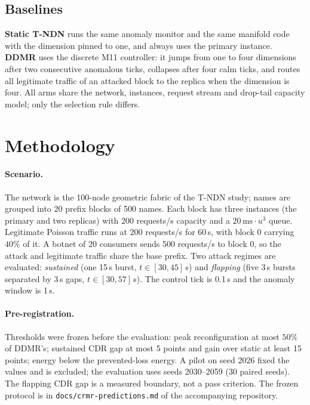 \documentclass[10pt,a4paper]{article}
\begin{document}
\subsection{Baselines}
\textbf{Static T-NDN} runs the same anomaly monitor and the same manifold code with
the dimension pinned to one, and always uses the primary instance.
\textbf{DDMR} uses the discrete M11 controller: it jumps from one to four
dimensions after two consecutive anomalous ticks, collapses after four calm ticks,
and routes all legitimate traffic of an attacked block to the replica when the
dimension is four. All arms share the network, instances, request stream and
drop-tail capacity model; only the selection rule differs.

\section{Methodology}
\label{sec:method}

\paragraph{Scenario.}
The network is the 100-node geometric fabric of the T-NDN study; names are
grouped into 20 prefix blocks of 500 names. Each block has three instances (the
primary and two replicas) with 200 requests/s capacity and a
$20\,\mathrm{ms}\cdot u^3$ queue. Legitimate Poisson traffic runs at 200
requests/s for 60\,s, with block 0 carrying $40\%$ of it. A botnet of 20 consumers
sends 500 requests/s to block 0, so the attack and legitimate traffic share the
base prefix. Two attack regimes are evaluated: \emph{sustained} (one 15\,s burst,
$t\in[30,45]$\,s) and \emph{flapping} (five 3\,s bursts separated by 3\,s gaps,
$t\in[30,57]$\,s). The control tick is 0.1\,s and the anomaly window is 1\,s.

\paragraph{Pre-registration.}
Thresholds were frozen before the evaluation: peak reconfiguration at most $50\%$
of DDMR's; sustained CDR gap at most 5 points and gain over static at least 15
points; energy below the prevented-loss energy. A pilot on seed 2026 fixed the
values and is excluded; the evaluation uses seeds 2030--2059 (30 paired seeds).
The flapping CDR gap is a measured boundary, not a pass criterion. The frozen
protocol is in \texttt{docs/crmr-predictions.md} of the accompanying repository.
\end{document}
